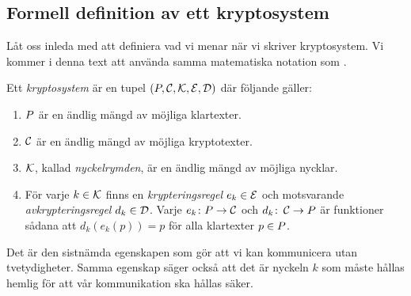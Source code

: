 \subsection{Formell definition av ett kryptosystem}
\noindent
Låt oss inleda med att definiera vad vi menar när vi skriver kryptosystem.
Vi kommer i denna text att använda samma matematiska notation som 
\citet{Stinson2006cta}.
\begin{definition}\label{def:kryptosystem}
  Ett \emph{kryptosystem} är en tupel 
  \((\P, \C, \K, \E, \D)\) där följande gäller:
  \begin{enumerate}
    \item \(\P\) är en ändlig mängd av möjliga klartexter.
    \item \(\operatorname{\mathcal{C}}\) är en ändlig mängd av möjliga kryptotexter.
    \item \(\operatorname{\mathcal{K}}\), kallad \emph{nyckelrymden}, är en ändlig mängd av möjliga 
      nycklar.
    \item För varje \(k\in \operatorname{\mathcal{K}}\) finns en 
      \emph{krypteringsregel} \(e_k\in \operatorname{\mathcal{E}}\) och 
      motsvarande \emph{avkrypteringsregel} \(d_k\in 
      \operatorname{\mathcal{D}}\).
      Varje \(e_k\colon \P\to \C\) och \(d_k\colon \C\to \P\) är funktioner 
      sådana att \(d_k(e_k(p)) = p\) för alla klartexter \(p\in \P\).
  \end{enumerate}
\end{definition}
Det är den sistnämda egenskapen som gör att vi kan kommunicera utan 
tvetydigheter.
Samma egenskap säger också att det är nyckeln \(k\) som måste hållas hemlig för 
att vår kommunikation ska hållas säker.
